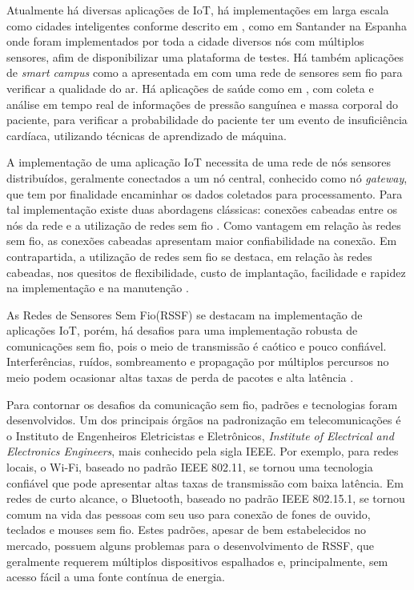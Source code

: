 Atualmente há diversas aplicações de IoT, há implementações em larga escala como cidades inteligentes conforme descrito em \cite{sotres2017practical}, como em Santander na Espanha onde foram implementados por toda a cidade diversos nós com múltiplos sensores, afim de disponibilizar uma plataforma de testes. Há também aplicações de \emph{smart campus} como a apresentada em \cite{wang2017performance} com uma rede de sensores sem fio para verificar a qualidade do ar. Há aplicações de saúde como em \cite{zhang2015remote}, com coleta e análise em tempo real de informações de pressão sanguínea e massa corporal do paciente, para verificar a probabilidade do paciente ter um evento de insuficiência cardíaca, utilizando técnicas de aprendizado de máquina.


A implementação de uma aplicação IoT necessita de uma rede de nós sensores distribuídos, geralmente conectados a um nó central, conhecido como nó \emph{gateway}, que tem por finalidade encaminhar os dados coletados para processamento. Para tal implementação existe duas abordagens clássicas: conexões cabeadas entre os nós da rede e a utilização de redes sem fio \cite{gomes2017estimaccao}. Como vantagem em relação às redes sem fio, as conexões cabeadas apresentam maior confiabilidade na conexão. Em contrapartida, a utilização de redes sem fio se destaca, em relação às redes cabeadas, nos quesitos de flexibilidade, custo de implantação, facilidade e rapidez na implementação e na manutenção \cite{gungor2009industrial}.

As Redes de Sensores Sem Fio(RSSF) se destacam na implementação de aplicações IoT, porém, há desafios para uma implementação robusta de comunicações sem fio, pois o meio de transmissão é caótico e pouco confiável. Interferências, ruídos, sombreamento e propagação por múltiplos percursos no meio podem ocasionar altas taxas de perda de pacotes e alta latência \cite{gomes2017estimaccao}.

Para contornar os desafios da comunicação sem fio, padrões e tecnologias foram desenvolvidos. Um dos principais órgãos na padronização em telecomunicações é o Instituto de Engenheiros Eletricistas e Eletrônicos, \emph{Institute of Electrical and Electronics Engineers}, mais conhecido pela sigla IEEE. Por exemplo, para redes locais, o Wi-Fi, baseado no padrão IEEE 802.11, se tornou uma tecnologia confiável que pode apresentar altas taxas de transmissão com baixa latência. Em redes de curto alcance, o Bluetooth, baseado no padrão IEEE 802.15.1, se tornou comum na vida das pessoas com seu uso para conexão de fones de ouvido, teclados e mouses sem fio. Estes padrões, apesar de bem estabelecidos no mercado, possuem alguns problemas para o desenvolvimento de RSSF, que geralmente requerem múltiplos dispositivos espalhados e, principalmente, sem acesso fácil a uma fonte contínua de energia.


